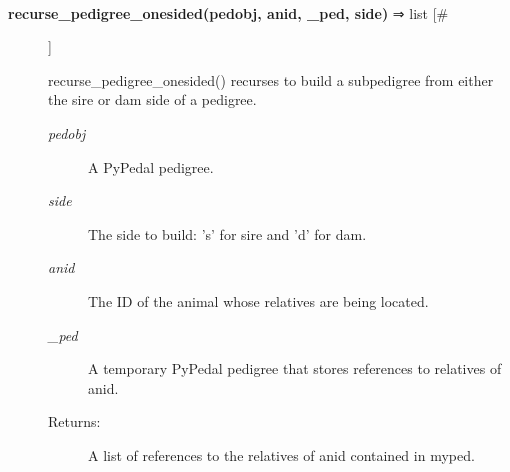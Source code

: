 \documentclass[10pt]{article}
\begin{document}
\begin{description}
\begin{description}
\end{description}
\\ 

\item[\textbf{recurse\_pedigree\_onesided(pedobj, anid, \_ped, side)}
 ⇒ list [\#]]

 recurse\_pedigree\_onesided() recurses to build a subpedigree from either the sire or dam side of a pedigree.
\begin{description}
\item[\emph{pedobj}
] A PyPedal pedigree.
\item[\emph{side}
] The side to build: 's' for sire and 'd' for dam.
\item[\emph{anid}
] The ID of the animal whose relatives are being located.
\item[\emph{\_ped}
] A temporary PyPedal pedigree that stores references to relatives of anid.
\item[Returns:] A list of references to the relatives of anid contained in myped.

\end{description}
\\ 


\end{description}
\end{document}
